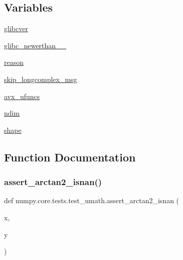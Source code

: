 \subsection*{Variables}
\begin{DoxyCompactItemize}
\item 
\hyperlink{namespacenumpy_1_1core_1_1tests_1_1test__umath_abf112f11de83647f25b9dcd67a9b3de2}{glibcver}
\item 
\hyperlink{namespacenumpy_1_1core_1_1tests_1_1test__umath_a13b259df861f647004ed705c98a57431}{glibc\+\_\+newerthan\+\_\+\_}
\item 
\hyperlink{namespacenumpy_1_1core_1_1tests_1_1test__umath_a07041122a4e3893873aa1617a1d6a367}{reason}
\item 
\hyperlink{namespacenumpy_1_1core_1_1tests_1_1test__umath_a54fc4cbd045245098c2746b80f3502fa}{skip\+\_\+longcomplex\+\_\+msg}
\item 
\hyperlink{namespacenumpy_1_1core_1_1tests_1_1test__umath_ab1a95c7f63bfbe3e786d4f95efe407e3}{avx\+\_\+ufuncs}
\item 
\hyperlink{namespacenumpy_1_1core_1_1tests_1_1test__umath_a333405aac1e6361cbaf50b8ec0e13146}{ndim}
\item 
\hyperlink{namespacenumpy_1_1core_1_1tests_1_1test__umath_a164759a76b873d13893096218bcf2c0e}{shape}
\end{DoxyCompactItemize}


\subsection{Function Documentation}
\mbox{\label{namespacenumpy_1_1core_1_1tests_1_1test__umath_aa8d77aa1591bb21acca6667dd35b8be3}} 
\subsubsection{\texorpdfstring{assert\+\_\+arctan2\+\_\+isnan()}{assert\_arctan2\_isnan()}}
{\footnotesize\ttfamily def numpy.\+core.\+tests.\+test\+\_\+umath.\+assert\+\_\+arctan2\+\_\+isnan (\begin{DoxyParamCaption}\item[{}]{x,  }\item[{}]{y }\end{DoxyParamCaption})}

